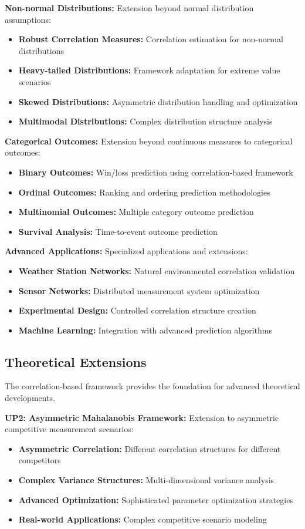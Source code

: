 \textbf{Non-normal Distributions:}
Extension beyond normal distribution assumptions:
\begin{itemize}
    \item \textbf{Robust Correlation Measures:} Correlation estimation for non-normal distributions
    \item \textbf{Heavy-tailed Distributions:} Framework adaptation for extreme value scenarios
    \item \textbf{Skewed Distributions:} Asymmetric distribution handling and optimization
    \item \textbf{Multimodal Distributions:} Complex distribution structure analysis
\end{itemize}

\textbf{Categorical Outcomes:}
Extension beyond continuous measures to categorical outcomes:
\begin{itemize}
    \item \textbf{Binary Outcomes:} Win/loss prediction using correlation-based framework
    \item \textbf{Ordinal Outcomes:} Ranking and ordering prediction methodologies
    \item \textbf{Multinomial Outcomes:} Multiple category outcome prediction
    \item \textbf{Survival Analysis:} Time-to-event outcome prediction
\end{itemize}

\textbf{Advanced Applications:}
Specialized applications and extensions:
\begin{itemize}
    \item \textbf{Weather Station Networks:} Natural environmental correlation validation
    \item \textbf{Sensor Networks:} Distributed measurement system optimization
    \item \textbf{Experimental Design:} Controlled correlation structure creation
    \item \textbf{Machine Learning:} Integration with advanced prediction algorithms
\end{itemize}

\subsection{Theoretical Extensions}

The correlation-based framework provides the foundation for advanced theoretical developments.

\textbf{UP2: Asymmetric Mahalanobis Framework:}
Extension to asymmetric competitive measurement scenarios:
\begin{itemize}
    \item \textbf{Asymmetric Correlation:} Different correlation structures for different competitors
    \item \textbf{Complex Variance Structures:} Multi-dimensional variance analysis
    \item \textbf{Advanced Optimization:} Sophisticated parameter optimization strategies
    \item \textbf{Real-world Applications:} Complex competitive scenario modeling
\end{itemize}

